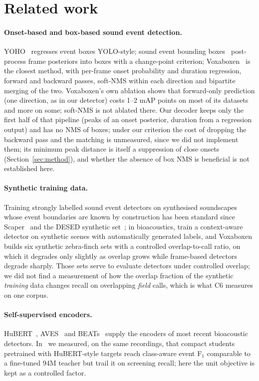\documentclass[10pt,twocolumn]{article}
\newcommand{\Fone}{F$_1$}
\begin{document}
\section{Related work}
\paragraph{Onset-based and box-based sound event detection.} YOHO~\citep{venkatesh2022yoho} regresses event boxes YOLO-style; sound event bounding boxes~\citep{ebbers2024sebbs} post-process frame posteriors into boxes with a change-point criterion; Voxaboxen~\citep{mahon2025voxaboxen} is the closest method, with per-frame onset probability and duration regression, forward and backward passes, soft-NMS within each direction and bipartite merging of the two. Voxaboxen's own ablation shows that forward-only prediction (one direction, as in our detector) costs 1--2 mAP points on most of its datasets and more on some; soft-NMS is not ablated there. Our decoder keeps only the first half of that pipeline (peaks of an onset posterior, duration from a regression output) and has no NMS of boxes; under our criterion the cost of dropping the backward pass and the matching is unmeasured, since we did not implement them; its minimum peak distance is itself a suppression of close onsets (Section~\ref{sec:method}), and whether the absence of box NMS is beneficial is not established here.
\paragraph{Synthetic training data.} Training strongly labelled sound event detectors on synthesised soundscapes whose event boundaries are known by construction has been standard since Scaper~\citep{salamon2017scaper} and the DESED synthetic set~\citep{turpault2019desed}; in bioacoustics, \citet{hoffman2025synthetic} train a context-aware detector on synthetic scenes with automatically generated labels, and Voxaboxen builds six synthetic zebra-finch sets with a controlled overlap-to-call ratio, on which it degrades only slightly as overlap grows while frame-based detectors degrade sharply. Those sets serve to evaluate detectors under controlled overlap; we did not find a measurement of how the overlap fraction of the synthetic \emph{training} data changes recall on overlapping \emph{field} calls, which is what C6 measures on one corpus.
\paragraph{Self-supervised encoders.} HuBERT~\citep{hsu2021hubert}, AVES~\citep{hagiwara2023aves} and BEATs~\citep{chen2023beats} supply the encoders of most recent bioacoustic detectors. In~\citep{sheipak2026what} we measured, on the same recordings, that compact students pretrained with HuBERT-style targets reach class-aware event \Fone{} comparable to a fine-tuned 94M teacher but trail it on screening recall; here the unit objective is kept as a controlled factor.
\end{document}
